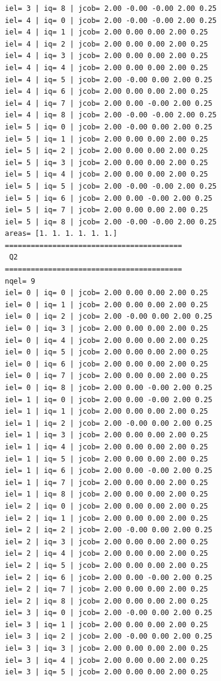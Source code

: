 \begin{tiny}
\begin{verbatim}
iel= 3 | iq= 8 | jcob= 2.00 -0.00 -0.00 2.00 0.25
iel= 4 | iq= 0 | jcob= 2.00 -0.00 -0.00 2.00 0.25
iel= 4 | iq= 1 | jcob= 2.00 0.00 0.00 2.00 0.25
iel= 4 | iq= 2 | jcob= 2.00 0.00 0.00 2.00 0.25
iel= 4 | iq= 3 | jcob= 2.00 0.00 0.00 2.00 0.25
iel= 4 | iq= 4 | jcob= 2.00 0.00 0.00 2.00 0.25
iel= 4 | iq= 5 | jcob= 2.00 -0.00 0.00 2.00 0.25
iel= 4 | iq= 6 | jcob= 2.00 0.00 0.00 2.00 0.25
iel= 4 | iq= 7 | jcob= 2.00 0.00 -0.00 2.00 0.25
iel= 4 | iq= 8 | jcob= 2.00 -0.00 -0.00 2.00 0.25
iel= 5 | iq= 0 | jcob= 2.00 -0.00 0.00 2.00 0.25
iel= 5 | iq= 1 | jcob= 2.00 0.00 0.00 2.00 0.25
iel= 5 | iq= 2 | jcob= 2.00 0.00 0.00 2.00 0.25
iel= 5 | iq= 3 | jcob= 2.00 0.00 0.00 2.00 0.25
iel= 5 | iq= 4 | jcob= 2.00 0.00 0.00 2.00 0.25
iel= 5 | iq= 5 | jcob= 2.00 -0.00 -0.00 2.00 0.25
iel= 5 | iq= 6 | jcob= 2.00 0.00 -0.00 2.00 0.25
iel= 5 | iq= 7 | jcob= 2.00 0.00 0.00 2.00 0.25
iel= 5 | iq= 8 | jcob= 2.00 -0.00 -0.00 2.00 0.25
areas= [1. 1. 1. 1. 1. 1.]
=========================================
 Q2
=========================================
nqel= 9
iel= 0 | iq= 0 | jcob= 2.00 0.00 0.00 2.00 0.25
iel= 0 | iq= 1 | jcob= 2.00 0.00 0.00 2.00 0.25
iel= 0 | iq= 2 | jcob= 2.00 -0.00 0.00 2.00 0.25
iel= 0 | iq= 3 | jcob= 2.00 0.00 0.00 2.00 0.25
iel= 0 | iq= 4 | jcob= 2.00 0.00 0.00 2.00 0.25
iel= 0 | iq= 5 | jcob= 2.00 0.00 0.00 2.00 0.25
iel= 0 | iq= 6 | jcob= 2.00 0.00 0.00 2.00 0.25
iel= 0 | iq= 7 | jcob= 2.00 0.00 0.00 2.00 0.25
iel= 0 | iq= 8 | jcob= 2.00 0.00 -0.00 2.00 0.25
iel= 1 | iq= 0 | jcob= 2.00 0.00 -0.00 2.00 0.25
iel= 1 | iq= 1 | jcob= 2.00 0.00 0.00 2.00 0.25
iel= 1 | iq= 2 | jcob= 2.00 -0.00 0.00 2.00 0.25
iel= 1 | iq= 3 | jcob= 2.00 0.00 0.00 2.00 0.25
iel= 1 | iq= 4 | jcob= 2.00 0.00 0.00 2.00 0.25
iel= 1 | iq= 5 | jcob= 2.00 0.00 0.00 2.00 0.25
iel= 1 | iq= 6 | jcob= 2.00 0.00 -0.00 2.00 0.25
iel= 1 | iq= 7 | jcob= 2.00 0.00 0.00 2.00 0.25
iel= 1 | iq= 8 | jcob= 2.00 0.00 0.00 2.00 0.25
iel= 2 | iq= 0 | jcob= 2.00 0.00 0.00 2.00 0.25
iel= 2 | iq= 1 | jcob= 2.00 0.00 0.00 2.00 0.25
iel= 2 | iq= 2 | jcob= 2.00 -0.00 0.00 2.00 0.25
iel= 2 | iq= 3 | jcob= 2.00 0.00 0.00 2.00 0.25
iel= 2 | iq= 4 | jcob= 2.00 0.00 0.00 2.00 0.25
iel= 2 | iq= 5 | jcob= 2.00 0.00 0.00 2.00 0.25
iel= 2 | iq= 6 | jcob= 2.00 0.00 -0.00 2.00 0.25
iel= 2 | iq= 7 | jcob= 2.00 0.00 0.00 2.00 0.25
iel= 2 | iq= 8 | jcob= 2.00 0.00 0.00 2.00 0.25
iel= 3 | iq= 0 | jcob= 2.00 -0.00 0.00 2.00 0.25
iel= 3 | iq= 1 | jcob= 2.00 0.00 0.00 2.00 0.25
iel= 3 | iq= 2 | jcob= 2.00 -0.00 0.00 2.00 0.25
iel= 3 | iq= 3 | jcob= 2.00 0.00 0.00 2.00 0.25
iel= 3 | iq= 4 | jcob= 2.00 0.00 0.00 2.00 0.25
iel= 3 | iq= 5 | jcob= 2.00 0.00 0.00 2.00 0.25

\end{verbatim}
\end{tiny}
